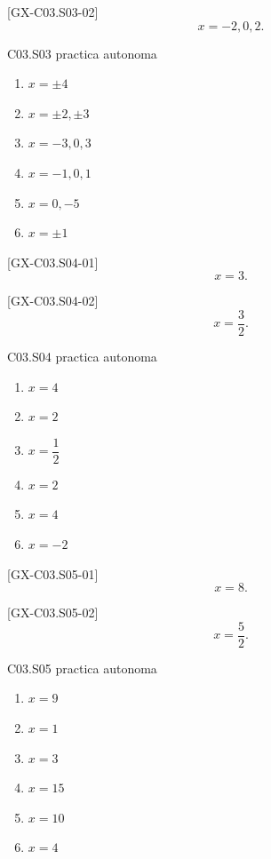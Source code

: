 \begin{shortanswer}{[GX-C03.S03-02]}
\[
x=-2,0,2.
\]
\end{shortanswer}

\begin{shortanswer}{C03.S03 practica autonoma}
\begin{enumerate}[label=\textbf{PX-C03.S03-\arabic*:}, leftmargin=*]
  \item \(x=\pm 4\)
  \item \(x=\pm 2,\pm 3\)
  \item \(x=-3,0,3\)
  \item \(x=-1,0,1\)
  \item \(x=0,-5\)
  \item \(x=\pm 1\)
\end{enumerate}
\end{shortanswer}

\begin{shortanswer}{[GX-C03.S04-01]}
\[
x=3.
\]
\end{shortanswer}

\begin{shortanswer}{[GX-C03.S04-02]}
\[
x=\frac{3}{2}.
\]
\end{shortanswer}

\begin{shortanswer}{C03.S04 practica autonoma}
\begin{enumerate}[label=\textbf{PX-C03.S04-\arabic*:}, leftmargin=*]
  \item \(x=4\)
  \item \(x=2\)
  \item \(x=\dfrac{1}{2}\)
  \item \(x=2\)
  \item \(x=4\)
  \item \(x=-2\)
\end{enumerate}
\end{shortanswer}

\begin{shortanswer}{[GX-C03.S05-01]}
\[
x=8.
\]
\end{shortanswer}

\begin{shortanswer}{[GX-C03.S05-02]}
\[
x=\frac{5}{2}.
\]
\end{shortanswer}

\begin{shortanswer}{C03.S05 practica autonoma}
\begin{enumerate}[label=\textbf{PX-C03.S05-\arabic*:}, leftmargin=*]
  \item \(x=9\)
  \item \(x=1\)
  \item \(x=3\)
  \item \(x=15\)
  \item \(x=10\)
  \item \(x=4\)
\end{enumerate}
\end{shortanswer}

